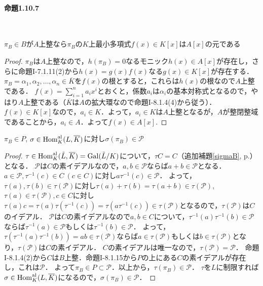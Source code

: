 \paragraph{命題1.10.7}~
\begin{screen}
    $\pi_B\in B$が$A$上整なら$\pi_B$の$K$上最小多項式$f(x)\in K[x]$は$A[x]$の元である
\end{screen}
\begin{proof}
  $\pi_B$は$A$上整なので，$h(\pi_B)=0$なるモニック$h(x)\in A[x]$が存在し，さらに命題I-7.1.11(2)から$h(x)=g(x)f(x)$なる$g(x)\in K[x]$が存在する．
  $\pi_B=\alpha_1,\alpha_2,\ldots,\alpha_n\in\overline{K}$を$f(x)$の根とすると，これらは$h(x)$の根なので$A$上整である．
  $f(x)=\sum_{i=1}^na_ix^i$とおくと，係数$a_i$は$\alpha_i$の基本対称式となるので，やはり$A$上整である（$\overline{K}$は$A$の拡大環なので命題I-8.1.4(4)から従う）．
  $f(x)\in K[x]$なので，$a_i\in K$．よって，$a_i\in K$は$A$上整となるが，$A$が整閉整域であることから，$a_i\in A$．よって$f(x)\in A[x]$.
\end{proof}

\begin{screen}
    $\pi_B\in P$, $\sigma\in\operatorname{Hom}^\text{al}_{K}(L,\overline{K})$に対し$\sigma(\pi_B)\in\mathcal{P}$
\end{screen}
\begin{proof}
  $\tau\in\operatorname{Hom}^\text{al}_K(\tilde{L},\overline{K})=\operatorname{Gal}(\tilde{L}/K)$について，$\tau C=C$（追加補題\ref{sigmaB}, p.\pageref{sigmaB}）となる．
  $\mathcal{P}$は$C$の素イデアルなので，$a,b\in\mathcal{P}$ならば$a+b\in\mathcal{P}$となる．
  $a\in\mathcal{P}, \tau^{-1}(c)\in C\ (c\in C)$に対し$a\tau^{-1}(c)\in\mathcal{P}$．
  よって，$\tau(a),\tau(b)\in\tau(\mathcal{P})$に対し$\tau(a)+\tau(b)=\tau(a+b)\in\tau(\mathcal{P})$, $\tau(a)\in\tau(\mathcal{P}), c\in C$に対し$\tau(a)c=\tau(a)\tau(\tau^{-1}(c))=\tau(a\tau^{-1}(c))\in\tau(\mathcal{P})$となるので，$\tau(\mathcal{P})$は$C$のイデアル．
  $\mathcal{P}$は$C$の素イデアルなので$a,b\in C$について，$\tau^{-1}(a)\tau^{-1}(b)\in\mathcal{P}$ならば$\tau^{-1}(a)\in\mathcal{P}$もしくは$\tau^{-1}(b)\in\mathcal{P}$．
  よって，$\tau(\tau^{-1}(a)\tau^{-1}(b))=ab\in\tau(\mathcal{P})$ならば$a\in\tau(\mathcal{P})$もしくは$b\in\tau(\mathcal{P})$となり，$\tau(\mathcal{P})$は$C$の素イデアル．
  $C$の素イデアルは唯一なので，$\tau(\mathcal{P})=\mathcal{P}$．
  命題I-8.1.4(2)から$C$は$B$上整．命題I-8.1.15から$P$の上にある$C$の素イデアルが存在し，これは$\mathcal{P}$．
  よって$\pi_B\in P\subset\mathcal{P}$．以上から，$\tau(\pi_B)\in\mathcal{P}$．
  $\tau$を$L$に制限すれば$\sigma\in\operatorname{Hom}^\text{al}_K(L,\overline{K})$になるので，$\sigma(\pi_B)\in\mathcal{P}$．
\end{proof}

